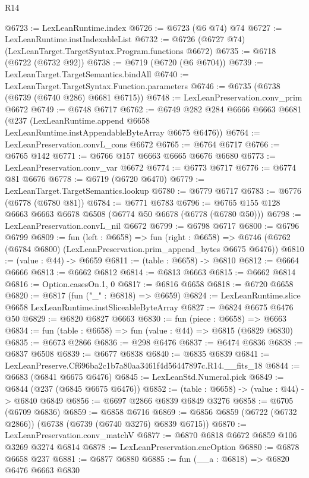 \begin{lexlean}{R14}
\begin{coremodule}
@6723 := LexLeanRuntime.index
@6726 := @6723 (@6 @74) @74
@6727 := LexLeanRuntime.instIndexableList
@6732 := @6726 (@6727 @74) (LexLeanTarget.TargetSyntax.Program.functions @6672)
@6735 := @6718 (@6722 (@6732 @92))
@6738 := @6719 (@6720 (@6 @6704))
@6739 := LexLeanTarget.TargetSemantics.bindAll
@6740 := LexLeanTarget.TargetSyntax.Function.parameters
@6746 := @6735 (@6738 (@6739 (@6740 @286) @6681 @6715))
@6748 := LexLeanPreservation.conv_prim @6672
@6749 := @6748 @6717
@6762 := @6749
    @282
    @284
    @6666
    @6663
    @6681
    (@237 (LexLeanRuntime.append @6658 LexLeanRuntime.instAppendableByteArray @6675 @6476))
@6764 := LexLeanPreservation.convL_cons @6672
@6765 := @6764 @6717
@6766 := @6765 @142
@6771 := @6766 @157 @6663 @6665 @6676 @6680
@6773 := LexLeanPreservation.conv_var @6672
@6774 := @6773 @6717
@6776 := @6774 @81 @6676
@6778 := @6719 (@6720 @6470)
@6779 := LexLeanTarget.TargetSemantics.lookup
@6780 := @6779 @6717
@6783 := @6776 (@6778 (@6780 @81))
@6784 := @6771 @6783
@6796 := @6765 @155 @128 @6663 @6663 @6678 @6508 (@6774 @50 @6678 (@6778 (@6780 @50)))
@6798 := LexLeanPreservation.convL_nil @6672
@6799 := @6798 @6717
@6800 := @6796 @6799
@6809 := fun (left : @6658) =>
  fun (right : @6658) =>
  @6746 (@6762 (@6784 @6800) (LexLeanPreservation.prim_append_bytes @6675 @6476))
@6810 := (value : @44) -> @6659
@6811 := (table : @6658) -> @6810
@6812 := @6664 @6666
@6813 := @6662 @6812
@6814 := @6813 @6663
@6815 := @6662 @6814
@6816 := Option.casesOn.{1, 0}
@6817 := @6816 @6658
@6818 := @6720 @6658
@6820 := @6817 (fun ("_" : @6818) => @6659)
@6824 := LexLeanRuntime.slice @6658 LexLeanRuntime.instSliceableByteArray
@6827 := @6824 @6675 @6476 @50
@6829 := @6820 @6827 @6663
@6830 := fun (piece : @6658) => @6663
@6834 := fun (table : @6658) => fun (value : @44) => @6815 (@6829 @6830)
@6835 := @6673 @2866
@6836 := @298 @6476
@6837 := @6474 @6836
@6838 := @6837 @6508
@6839 := @6677 @6838
@6840 := @6835 @6839
@6841 := LexLeanPreserve.Cf696ba2c1b7a80aa3461f4d56447897c.R14.__fits_18
@6844 := @6683 (@6841 @6675 @6476)
@6845 := LexLeanStd.Numeral.pick
@6849 := @6844 (@237 (@6845 @6675 @6476))
@6852 := (table : @6658) -> (value : @44) -> @6840 @6849
@6856 := @6697 @2866 @6839 @6849 @3276
@6858 := @6705 (@6709 @6836)
@6859 := @6858 @6716
@6869 := @6856 @6859 (@6722 (@6732 @2866)) (@6738 (@6739 (@6740 @3276) @6839 @6715))
@6870 := LexLeanPreservation.conv_matchV
@6877 := @6870 @6818 @6672 @6859 @106 @3269 @3274 @6814
@6878 := LexLeanPreservation.encOption
@6880 := @6878 @6658 @237
@6881 := @6877 @6880
@6885 := fun (__a : @6818) => @6820 @6476 @6663 @6830

\end{coremodule}
\end{lexlean}
